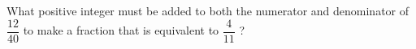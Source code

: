 What positive integer must be added to both the numerator and denominator of $\dfrac{12}{40}$ to make a fraction that is equivalent to $\dfrac{4}{11}$ ?
